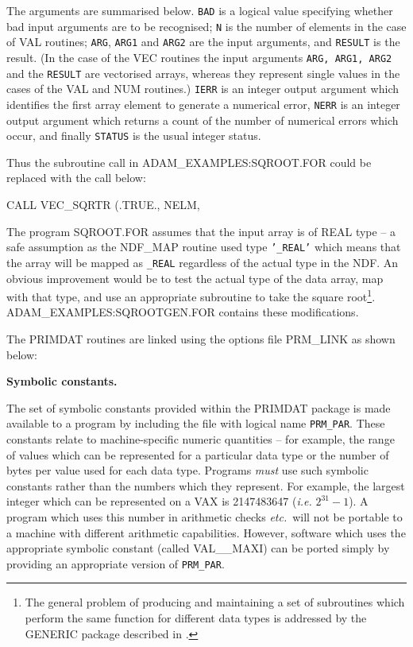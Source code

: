 \documentclass[twoside,11pt,nolof]{starlink}
\begin{document}
The arguments are summarised below.
\texttt{BAD} is a logical value specifying whether
bad input arguments are to be recognised;
\texttt{N} is the number of elements in the case of VAL routines;
\texttt{ARG}, \texttt{ARG1} and \texttt{ARG2} are the input
arguments, and \texttt{RESULT} is the result.
(In the case of the VEC routines the input
arguments \texttt{ARG, ARG1, ARG2}  and the \texttt{RESULT}  are vectorised arrays,
whereas they represent  single values in the cases of the VAL and NUM
routines.)
\texttt{IERR} is an integer output argument which identifies the
first array element to generate a numerical error,
\texttt{NERR} is an integer output argument which returns a count of the
number of numerical errors which occur,
and finally \texttt{STATUS} is the usual integer status.

Thus the subroutine call in ADAM\_EXAMPLES:SQROOT.FOR could be
replaced with the call below:
\begin{small}
\begin{terminalv}
      CALL VEC_SQRTR (.TRUE., NELM, %
\end{terminalv}
\end{small}
The program SQROOT.FOR assumes that the input array is of
REAL type -- a safe assumption as
the NDF\_MAP routine used type {\tt'\_REAL'} which means that the array
will be mapped as {\tt\_REAL} regardless of the actual type in the NDF.
An obvious improvement would be to test the actual type of the data array,
map with that type, and
use an appropriate subroutine to take the square
root\footnote{The general problem of producing and maintaining
a set of subroutines which perform the same function for different
data types is addressed by  the GENERIC package described in
.}.
ADAM\_EXAMPLES:SQROOTGEN.FOR contains these modifications.

The PRIMDAT routines are linked using the options file PRM\_LINK as shown
below:

{\bigskip\large\bf Symbolic constants.}

The  set of symbolic constants provided within the PRIMDAT package is
made available to a program by including the file with logical name
\texttt{PRM\_PAR}.
These constants relate to machine-specific numeric quantities -- for
example, the
range of values which can be represented for a particular data type or
the number of bytes per value used for each data type.
Programs {\sl must\/}  use such symbolic constants  rather than
the numbers which they represent.
For example, the largest integer which can be represented on a VAX is
2147483647 (\textit{i.e.} $2^{31}-1$).
A program which uses this number in arithmetic checks
\textit{etc.}\ will not be portable to a machine with different arithmetic capabilities.
However, software which uses the appropriate symbolic constant  (called
VAL\_\_MAXI) can
be  ported  simply by providing an appropriate version of \texttt{PRM\_PAR}.
\end{document}
